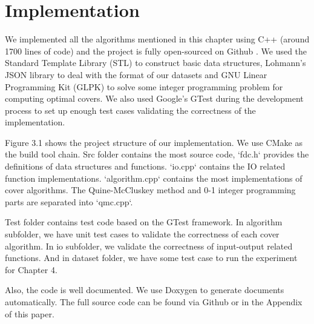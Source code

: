 \documentclass[11pt]{book}
\begin{document}
\section{Implementation}

We implemented all the algorithms mentioned in this chapter using C++ (around 1700 lines of code) and the project is fully open-sourced on Github \cite{githubfdc}. We used the Standard Template Library (STL) \cite{plauger2000c++} to construct basic data structures, Lohmann's JSON library \cite{nlohmann_json} to deal with the format of our datasets and GNU Linear Programming Kit (GLPK) \cite{makhorin2008glpk} to solve some integer programming problem for computing optimal covers. We also used Google's GTest \cite{barca2016gtest} during the development process to set up enough test cases validating the correctness of the implementation.

Figure 3.1 shows the project structure of our implementation. We use CMake \cite{martin2010mastering} as the build tool chain. Src folder contains the most source code, `fdc.h` provides the definitions of data structures and functions. `io.cpp` contains the IO related function implementations. `algorithm.cpp` contains the most implementations of cover algorithms. The Quine-McCluskey method and 0-1 integer programming parts are separated into `qmc.cpp`.

Test folder contains test code based on the GTest \cite{barca2016gtest} framework. In algorithm subfolder, we have unit test cases to validate the correctness of each cover algorithm. In io subfolder, we validate the correctness of input-output related functions. And in dataset folder, we have some test case to run the experiment for Chapter 4.

Also, the code is well documented. We use Doxygen \cite{laramee2011bob} to generate documents automatically. The full source code can be found via Github \cite{githubfdc} or in the Appendix of this paper.
\end{document}
